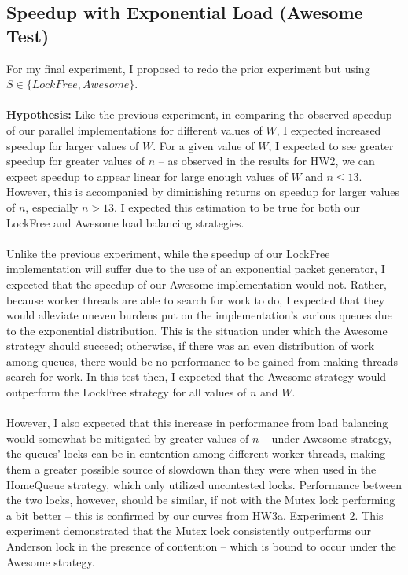 \documentclass[]{article}
\begin{document}
\subsection{Speedup with Exponential Load (Awesome Test)}
For my final experiment, I proposed to redo the prior experiment but using $S \in \{LockFree, Awesome\}$.
\\\\
\textbf{Hypothesis:} Like the previous experiment, in comparing the observed speedup of our parallel implementations for different values of $W$, I expected increased speedup for larger values of $W$. For a given value of $W$, I expected to see greater speedup for greater values of $n$ -- as observed in the results for HW2, we can expect speedup to appear linear for large enough values of $W$ and $n \leq 13$. However, this is accompanied by diminishing returns on speedup for larger values of $n$, especially $n > 13$. I expected this estimation to be true for both our LockFree and Awesome load balancing strategies.
\\\\
Unlike the previous experiment, while the speedup of our LockFree implementation will suffer due to the use of an exponential packet generator, I expected that the speedup of our Awesome implementation  would not. Rather, because worker threads are able to search for work to do, I expected that they would alleviate uneven burdens put on the implementation's various queues due to the exponential distribution. This is the situation under which the Awesome strategy should succeed; otherwise, if there was an even distribution of work among queues, there would be no performance to be gained from making threads search for work. In this test then, I expected that the Awesome strategy would outperform the LockFree strategy for all values of $n$ and $W$.
\\\\
However, I also expected that this increase in performance from load balancing would somewhat be mitigated by greater values of $n$ -- under Awesome strategy, the queues' locks can be in contention among different worker threads, making them a greater possible source of slowdown than they were when used in the HomeQueue strategy, which only utilized uncontested locks. Performance between the two locks, however, should be similar, if not with the Mutex lock performing a bit better -- this is confirmed by our curves from HW3a, Experiment 2. This experiment demonstrated that the Mutex lock consistently outperforms our Anderson lock in the presence of contention -- which is bound to occur under the Awesome strategy.
\end{document}
